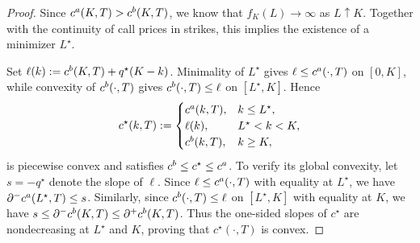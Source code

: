 \documentclass[10pt,a4paper]{amsart}
\begin{document}
\begin{proof}
Since $c^{\rm a}(K,T)>c^{\rm b}(K,T)$, we know that $f_K(L)\to\infty$ as
$L\uparrow K$. Together with the continuity of call prices in strikes, this implies the existence of a minimizer $L^\star$. 

Set
$\ell(k):=c^{\rm b}(K,T)+q^\star(K-k)$. Minimality of $L^\star$ gives
$\ell\le c^{\rm a}(\cdot,T)$ on $[0,K]$, while convexity of
$c^{\rm b}(\cdot,T)$ gives $c^{\rm b}(\cdot,T)\le\ell$ on
$[L^\star,K]$. Hence
\[
c^\star(k,T):=
\begin{cases}
c^{\rm a}(k,T),&k\le L^\star,\\
\ell(k),&L^\star<k<K,\\
c^{\rm b}(k,T),&k\ge K,
\end{cases}
\]
is piecewise convex and satisfies
$c^{\rm b}\le c^\star\le c^{\rm a}$. To verify its global convexity, let $s=-q^\star$ denote the slope of
$\ell$. Since $\ell\le c^{\rm a}(\cdot,T)$ with equality at $L^\star$,
we have $\partial^-c^{\rm a}(L^\star,T)\le s$. Similarly, since
$c^{\rm b}(\cdot,T)\le\ell$ on $[L^\star,K]$ with equality at $K$, we
have $s\le\partial^-c^{\rm b}(K,T)\le\partial^+c^{\rm b}(K,T)$. Thus
the one-sided slopes of $c^\star$ are nondecreasing at $L^\star$ and
$K$, proving that $c^\star(\cdot,T)$ is convex.


\end{proof}
\end{document}
